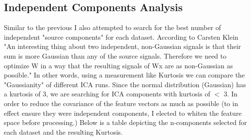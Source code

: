 \subsection{Independent Components Analysis}\label{subsec:independent-components-analysis}
Similar to the previous I also attempted to search for the best number of independent "source components" for each dataset.
According to Carsten Klein\cite{klein_2019}
"An interesting thing about two independent, non-Gaussian signals is that their sum is more Gaussian than any of the source signals.
Therefore we need to optimize W in a way that the resulting signals of Wx are as non-Gaussian as possible."
In other words, using a measurement like Kurtosis we can compare the "Gaussianity" of different ICA runs.
Since the normal distribution (Gaussian) has a kurtosis of 3, we are searching for ICA components with kurtosis of $<$ 3.
In order to reduce the covariance of the feature vectors as much as possible (to in effect ensure they were independent
components, I elected to whiten the feature space before processing.)
Below is a table depicting the n-components selected for each dataset and the resulting Kurtosis.
